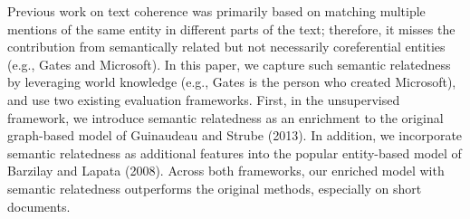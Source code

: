 Previous work on text coherence was primarily based on matching multiple mentions of the same entity in different parts of the text; therefore, it misses the contribution from semantically related but not necessarily coreferential entities (e.g., Gates and Microsoft). In this paper, we capture such semantic relatedness by leveraging world knowledge (e.g., Gates is the person who created Microsoft), and use two existing evaluation frameworks. First, in the unsupervised framework, we introduce semantic relatedness as an enrichment to the original graph-based model of Guinaudeau and Strube (2013). In addition, we incorporate semantic relatedness as additional features into the popular entity-based model of Barzilay and Lapata (2008). Across both frameworks, our enriched model with semantic relatedness outperforms the original methods, especially on short documents.
